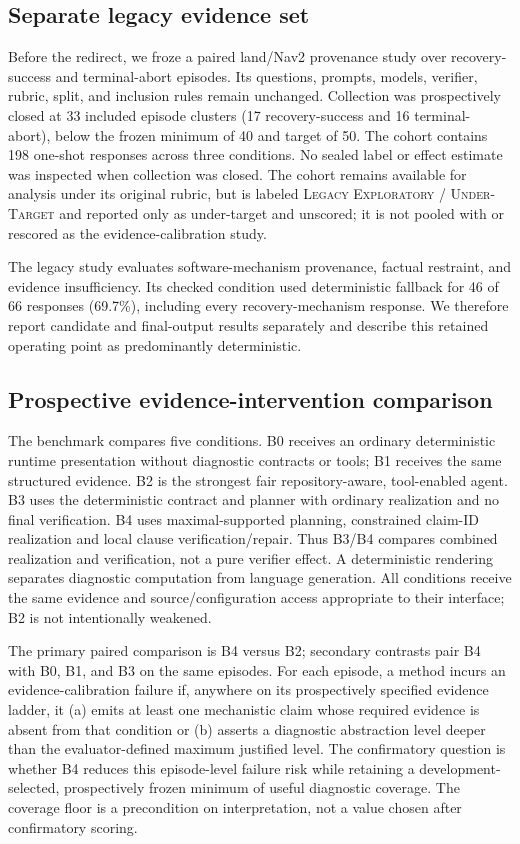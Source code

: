 \documentclass[conference]{IEEEtran}
\begin{document}
\subsection{Separate legacy evidence set}

Before the redirect, we froze a paired land/Nav2 provenance study over recovery-success and
terminal-abort episodes. Its questions, prompts, models, verifier, rubric, split, and inclusion
rules remain unchanged. Collection was prospectively closed at 33 included episode clusters (17
recovery-success and 16 terminal-abort), below the frozen minimum of 40 and target of 50. The
cohort contains 198 one-shot responses across three conditions. No sealed label or effect estimate
was inspected when collection was closed. The cohort remains available for analysis under its
original rubric, but is labeled \textsc{Legacy Exploratory / Under-Target} and reported only as
under-target and unscored; it is not pooled with or rescored as the evidence-calibration study.

The legacy study evaluates software-mechanism provenance, factual restraint, and evidence
insufficiency. Its checked condition used deterministic fallback for 46 of 66 responses (69.7\%),
including every recovery-mechanism response. We therefore report candidate and final-output
results separately and describe this retained operating point as predominantly deterministic.

\subsection{Prospective evidence-intervention comparison}

The benchmark compares five conditions. B0 receives an ordinary deterministic runtime
presentation without diagnostic contracts or tools; B1 receives the same structured evidence.
B2 is the strongest fair repository-aware, tool-enabled agent. B3 uses the deterministic contract
and planner with ordinary realization and no final verification. B4 uses maximal-supported
planning, constrained claim-ID realization and local clause verification/repair. Thus B3/B4
compares combined realization and verification, not a pure verifier effect. A deterministic
rendering separates diagnostic computation from language generation. All conditions receive
the same evidence and source/configuration access appropriate to their interface; B2 is not
intentionally weakened.

The primary paired comparison is B4 versus B2; secondary contrasts pair B4 with B0, B1, and B3
on the same episodes. For each episode, a method
incurs an evidence-calibration failure if, anywhere on its prospectively specified evidence
ladder, it (a) emits at least one mechanistic claim whose required evidence is absent from that
condition or (b) asserts a diagnostic abstraction level deeper than the evaluator-defined maximum
justified level. The confirmatory question is whether B4 reduces this episode-level failure risk
while retaining a development-selected, prospectively frozen minimum of useful diagnostic
coverage. The coverage floor is a precondition on interpretation, not a value chosen after
confirmatory scoring.
\end{document}
